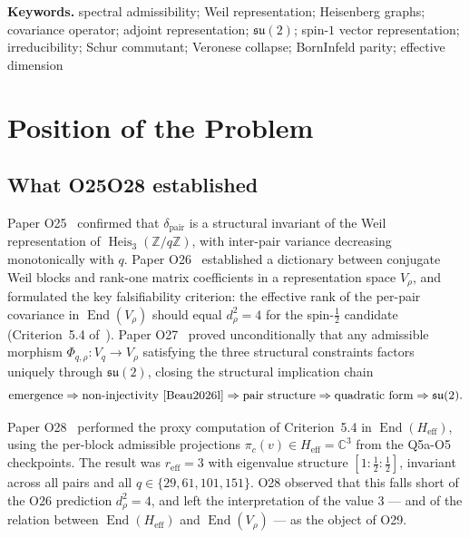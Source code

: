 \documentclass[12pt,a4paper]{article}
\theoremstyle{remark}
\DeclareMathOperator{\End}{End}
\DeclareMathOperator{\Heis}{Heis}
\newcommand{\su}{\mathfrak{su}}
\newcommand{\Heff}{H_{\mathrm{eff}}}
\newcommand{\Vrho}{V_{\rho}}
\newcommand{\reff}{r_{\mathrm{eff}}}
\newcommand{\dpair}{\delta_{\mathrm{pair}}}
\begin{document}
  \textbf{Keywords.}
  spectral admissibility; Weil representation; Heisenberg graphs; covariance operator; adjoint representation;
  $\su(2)$; spin-$1$ vector representation; irreducibility; Schur commutant; Veronese collapse;
  Born\textendash{}Infeld parity; effective dimension

  \clearpage
  \tableofcontents

  \clearpage
  \section{Position of the Problem}

    \subsection{What O25\textendash{}O28 established}

      Paper O25~\cite{Beau2026a29} confirmed that $\dpair$ is a structural invariant of the Weil representation of
      $\Heis_3(\mathbb{Z}/q\mathbb{Z})$, with inter-pair variance decreasing monotonically with $q$.
      Paper O26~\cite{Beau2026a30} established a dictionary between conjugate Weil blocks and rank-one matrix
      coefficients in a representation space $\Vrho$, and formulated the key falsifiability criterion: the effective
      rank of the per-pair covariance in $\End(\Vrho)$ should equal $d_{\rho}^2 = 4$ for the spin-$\tfrac{1}{2}$
      candidate (Criterion~5.4 of~\cite{Beau2026a30}).
      Paper O27~\cite{Beau2026a31} proved unconditionally that any admissible morphism
      $\Phi_{q,\rho} : V_q \to \Vrho$ satisfying the three structural constraints factors uniquely through $\su(2)$,
      closing the structural implication chain
      \begin{equation}
        \text{emergence} \Rightarrow \text{non-injectivity}~\cite{Beau2026l}
        \Rightarrow \text{pair structure} \Rightarrow \text{quadratic form}
        \Rightarrow \su(2).
        \label{eq:chain}
      \end{equation}

      Paper O28~\cite{Beau2026a32} performed the proxy computation of Criterion~5.4 in $\End(\Heff)$, using the
      per-block admissible projections $\pi_c(v) \in \Heff = \mathbb{C}^3$ from the Q5a-O5 checkpoints.
      The result was $\reff = 3$ with eigenvalue structure $[1 : \tfrac{1}{2} : \tfrac{1}{2}]$, invariant across all
      pairs and all $q \in \{29, 61, 101, 151\}$.
      O28 observed that this falls short of the O26 prediction $d_{\rho}^2 = 4$, and left the interpretation of the
      value $3$ --- and of the relation between $\End(\Heff)$ and $\End(\Vrho)$ --- as the object of O29.
\end{document}
